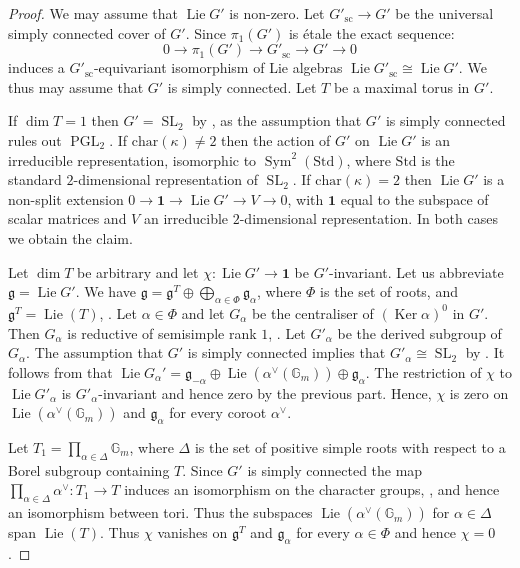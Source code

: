 \documentclass{amsart}
\theoremstyle{definition}
\theoremstyle{remark}
\DeclareMathOperator{\Sym}{Sym}
\DeclareMathOperator{\SL}{SL}
\DeclareMathOperator{\Ker}{Ker}
\newcommand{\Eins}{\mathbf 1}
\newcommand{\Std}{\mathrm{Std}}
\newcommand{\Gm}{\mathbb G_{m}}
\DeclareMathOperator{\PGL}{PGL}
\newcommand{\cha}{\mathrm{char}}
\DeclareMathOperator{\Lie}{Lie}
\newcommand{\sic}{\operatorname{sc}}
\begin{document}
 \begin{proof} We may assume that $\Lie G'$ is non-zero. 
 Let $G'_{\sic} \rightarrow G'$ be the universal simply connected cover of $G'$. Since $\pi_1(G')$ is \'etale the exact sequence:
 $$ 0 \rightarrow \pi_1(G')\rightarrow G'_{\sic}\rightarrow 
 G'\rightarrow 0$$ 
induces a $G'_{\sic}$-equivariant  isomorphism of Lie algebras $\Lie G'_{\sic}\cong \Lie G'$. We thus may assume 
that $G'$ is simply connected.  Let $T$ be a maximal torus in $G'$. 

 
 
 If $\dim T=1$ then $G'=\SL_2$ by  \cite[7.2.4]{springer}, as the assumption that $G'$ is simply connected rules out $\PGL_2$. If $\cha(\kappa) \neq 2$ then the action of $G'$
 on $\Lie G'$  is an irreducible representation, isomorphic to 
 $\Sym^2(\Std)$, where $\Std$ is the standard $2$-dimensional representation of $\SL_2$.
If $\cha(\kappa)=2$ then $\Lie G'$  is a non-split extension 
 $0\rightarrow \Eins \rightarrow \Lie G'
 \rightarrow V\rightarrow 0$, with $\Eins$
 equal to the subspace of scalar matrices and $V$ an irreducible 
 $2$-dimensional representation.
 In both cases we obtain the claim. 
 
 Let $\dim T$ be arbitrary and let $\chi: \Lie G'\rightarrow \Eins$ be $G'$-invariant. 
 Let us abbreviate $\mathfrak g= \Lie G'$.
 We have $\mathfrak g= \mathfrak g^T \oplus \bigoplus\nolimits_{\alpha\in \Phi} \mathfrak g_{\alpha}$, where $\Phi$ is the set of roots, and $\mathfrak g^T= \Lie(T)$, \cite[13.18(1)]{borel}.  
 Let $\alpha\in \Phi$ and let $G_{\alpha}$ be the centraliser of $(\Ker \alpha)^0$ in $G'$. Then $G_{\alpha}$ is reductive of semisimple rank $1$, \cite[13.18(4)]{borel}. Let $G'_{\alpha}$ be the derived subgroup of $G_{\alpha}$. The assumption 
 that $G'$ is simply connected implies that 
 $G'_{\alpha}\cong \SL_2$ by \cite[5.3.9]{conrad}.
 It follows from 
 \cite[1.2.7]{conrad} that $\Lie G_{\alpha}'= 
 \mathfrak g_{-\alpha}\oplus \Lie (\alpha^{\vee}(\Gm))\oplus
 \mathfrak g_{\alpha}$. The restriction of $\chi$ to 
 $\Lie G'_{\alpha}$ is $G'_{\alpha}$-invariant and hence zero 
 by the previous part. 
 Hence, $\chi$ is zero on $\Lie (\alpha^{\vee}(\Gm))$ and $\mathfrak g_{\alpha}$ for every coroot $\alpha^{\vee}$. 

 Let $T_1=\prod_{\alpha\in\Delta}\Gm$, where $\Delta$ is the set of positive simple roots 
 with respect to a Borel subgroup containing $T$. Since $G'$ is simply connected 
 the map $\prod_{\alpha\in \Delta} \alpha^{\vee}: T_1\rightarrow T$ induces an isomorphism
 on the character groups, \cite[Example 1.3.10]{bcnrd}, and hence an isomorphism between tori. Thus  
 the subspaces $\Lie(\alpha^{\vee}(\Gm))$ for $\alpha\in \Delta$ span $\Lie (T)$. Thus $\chi$ vanishes on $\mathfrak g^T$ and $\mathfrak g_{\alpha}$ for every $\alpha\in \Phi$ and hence $\chi=0$.
 \end{proof} 
\end{document}
